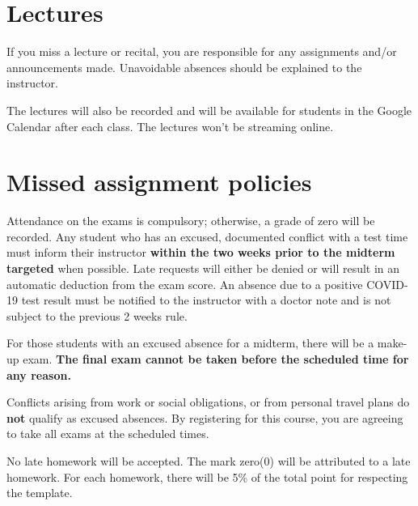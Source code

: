 \documentclass[12pt]{amsart}
\newcommand{\svs}{\vspace{.1cm}}
\begin{document}

\section*{Lectures}
If you miss a lecture or recital, you are responsible for any assignments and/or announcements made. Unavoidable absences should be explained to the instructor. 

The lectures will also be recorded and will be available for students in the Google Calendar after each class. The lectures won't be streaming online.  

\section*{Missed assignment policies}
  Attendance on the exams is compulsory; otherwise, a grade of zero will be recorded. Any student who has an excused, documented conflict with a test time must inform their instructor \textbf{within the two weeks prior to the midterm targeted} when possible.  Late requests will either be denied or will result in an automatic deduction from the exam score. An absence due to a positive COVID-19 test result must be notified to the instructor with a doctor note and is not subject to the previous 2 weeks rule.

For those students with an excused absence for a midterm, there will be a make-up exam. \textbf{The final exam cannot be taken before the scheduled time for any reason.}

Conflicts arising from work or social obligations, or from personal travel plans do \textbf{not} qualify as excused absences. By registering for this course, you are agreeing to take all exams at the scheduled times.

\svs

 No late homework will be accepted. The mark zero(0) will be attributed to a late homework. For each homework, there will be 5\% of the total point for respecting the template.
\svs
\end{document}
